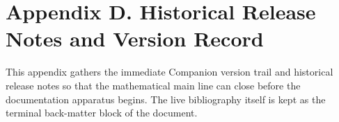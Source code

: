 \section*{Appendix D. Historical Release Notes and Version Record}

This appendix gathers the immediate Companion version trail and historical release notes so that the mathematical main line can close before the documentation apparatus begins. The live bibliography itself is kept as the terminal back-matter block of the document.

\clearpage
